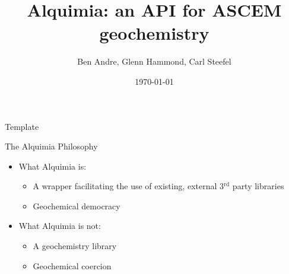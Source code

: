 \documentclass{beamer}
\newcommand\redcolor[1]{{{\color{red} #1}}}
\newcommand\bluecolor[1]{{{\color{blue} #1}}}
\begin{document}
\title[Alquimia]{Alquimia: an API for ASCEM geochemistry}
\author[]{Ben Andre, Glenn Hammond, Carl Steefel}
\date{\today}

\begin{frame}{Template}
\end{frame}

\frame{\titlepage}

\begin{frame}{The Alquimia Philosophy}
\Large
\begin{itemize}
\item What Alquimia \bluecolor{is}:
\begin{itemize}
\Large
\item A wrapper facilitating the use of existing, external
      3$^\text{rd}$ party libraries
\item Geochemical democracy
\end{itemize}

\vspace{1cm}
\item What Alquimia \redcolor{is not}:
\begin{itemize}
\Large
\item A geochemistry library
\item Geochemical coercion
\end{itemize}
\end{itemize}
\end{frame}
\end{document}
